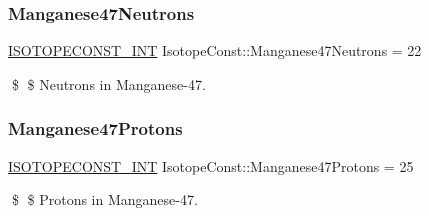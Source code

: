 \subsubsection{\texorpdfstring{Manganese47\+Neutrons}{Manganese47Neutrons}}
{\footnotesize\ttfamily \mbox{\hyperlink{group___isotope_const-_macros_ga5f18360b3e99483a35c32d789e62621c}{I\+S\+O\+T\+O\+P\+E\+C\+O\+N\+S\+T\+\_\+\+I\+NT}} Isotope\+Const\+::\+Manganese47\+Neutrons = 22}

\$ \$ Neutrons in Manganese-\/47. \mbox{\label{group___isotope_const-_manganese-_mn47_gacc11718818410a64813ac7226ee6f63a}} 
\subsubsection{\texorpdfstring{Manganese47\+Protons}{Manganese47Protons}}
{\footnotesize\ttfamily \mbox{\hyperlink{group___isotope_const-_macros_ga5f18360b3e99483a35c32d789e62621c}{I\+S\+O\+T\+O\+P\+E\+C\+O\+N\+S\+T\+\_\+\+I\+NT}} Isotope\+Const\+::\+Manganese47\+Protons = 25}

\$ \$ Protons in Manganese-\/47. 